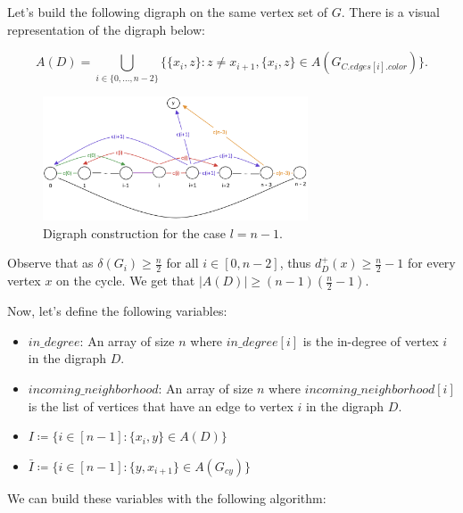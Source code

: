 Let's build the following digraph on the same vertex set of $G$. There is a visual representation
of the digraph below:

$$
A(D) = \bigcup_{i \in \{0,..., n - 2\}} \{\{x_i, z\} : z \neq x_{i + 1}, \{x_i, z\} \in A(G_{C.edges[i].color})\}.
$$

\begin{figure}[H]
    \centering
    \includegraphics[width=0.7\textwidth]{figuras/cycle_n-1_digraph.png}
    \caption{Digraph construction for the case $l = n - 1$.}
    \label{fig:cycle_n-1_digraph}
\end{figure}

Observe that as $\delta(G_i) \geq \frac{n}{2}$ for all $i \in [0, n - 2]$, thus 
$d^+_{D}(x) \geq \frac{n}{2} - 1$ for every vertex $x$ on the cycle. We get that 
$|A(D)| \geq (n-1)(\frac{n}{2} - 1)$. 

Now, let's define the following variables:

\begin{itemize}
    \item $in\_degree$: An array of size $n$ where $in\_degree[i]$ is the in-degree of vertex $i$ in the digraph $D$.
    \item $incoming\_neighborhood$: An array of size $n$ where $incoming\_neighborhood[i]$ is the list of vertices that have an edge to vertex $i$ in the digraph $D$.
    \item $I \coloneqq \{i \in [n - 1]: \{x_i, y\} \in A(D)\}$
    \item $\bar{I} \coloneqq \{i \in [n - 1]: \{y, x_{i+1}\} \in A(G_{cy})\}$
\end{itemize}

We can build these variables with the following algorithm:

